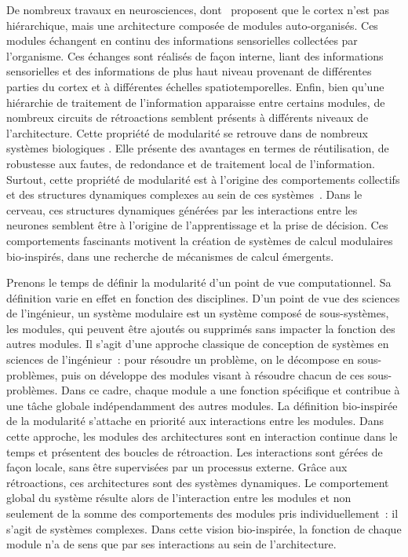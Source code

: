 De nombreux travaux en neurosciences, dont~\cite{binzegger05, Meunier2009HierarchicalMI,sporns_structure_2013,betzel_multi-scale_2017} proposent que le cortex n'est pas hiérarchique, mais une architecture composée de modules auto-organisés.
Ces modules échangent en continu des informations sensorielles collectées par l'organisme. Ces échanges sont réalisés de façon interne, liant des informations sensorielles et des informations de plus haut niveau provenant de différentes parties du cortex et à différentes échelles spatiotemporelles. 
Enfin, bien qu'une hiérarchie de traitement de l'information apparaisse entre certains modules, de nombreux circuits de rétroactions semblent présents à différents niveaux de l'architecture.
Cette propriété de modularité se retrouve dans de nombreux systèmes biologiques \parencite{clune_evolutionary_2013}. Elle présente des avantages en termes de réutilisation, de robustesse aux fautes, de redondance et de traitement local de l'information. Surtout, cette propriété de modularité est à l'origine des comportements collectifs et des structures dynamiques complexes au sein de ces systèmes~\parencite{flake_computational,Siebert2020RoleOM}.
Dans le cerveau, ces structures dynamiques générées par les interactions entre les neurones semblent être à l'origine de l'apprentissage et la prise de décision. Ces comportements fascinants motivent la création de systèmes de calcul modulaires bio-inspirés, dans une recherche de mécanismes de calcul émergents.

Prenons le temps de définir la modularité d'un point de vue computationnel. 
Sa définition varie en effet en fonction des disciplines. D'un point de vue des sciences de l'ingénieur, un système modulaire est un système composé de sous-systèmes, les modules, qui peuvent être ajoutés ou supprimés sans impacter la fonction des autres modules.
Il s'agit d'une approche classique de conception de systèmes en sciences de l'ingénieur~: pour résoudre un problème, on le décompose en sous-problèmes, puis on développe des modules visant à résoudre chacun de ces sous-problèmes.
Dans ce cadre, chaque module a une fonction spécifique et contribue à une tâche globale indépendamment des autres modules.
La définition bio-inspirée de la modularité s'attache en priorité aux interactions entre les modules.
Dans cette approche, les modules des architectures sont en interaction continue dans le temps et présentent des boucles de rétroaction. Les interactions sont gérées de façon locale, sans être supervisées par un processus externe. Grâce aux rétroactions, ces architectures sont des systèmes dynamiques.
Le comportement global du système résulte alors de l'interaction entre les modules et non seulement de la somme des comportements des modules pris individuellement~: il s'agit de systèmes complexes.
Dans cette vision bio-inspirée, la fonction de chaque module n'a de sens que par ses interactions au sein de l'architecture.

